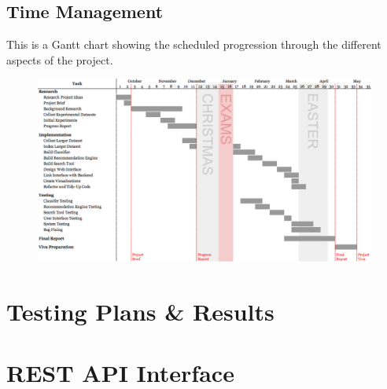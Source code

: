 \documentclass[11pt,a4paper]{report}
\begin{document}
\begin{landscape}
    \appendix
    \chapter{Time Management}
    \label{appendix:gantt}
    This is a Gantt chart showing the scheduled progression through the different aspects of the project.

    \begin{figure}[H]
        \centering
        \includegraphics[height=0.85\textwidth]{gantt.png}
    \end{figure}
\end{landscape}

\chapter{Testing Plans \& Results}
\pagebreak

\chapter{REST API Interface}
\pagebreak
\end{document}
